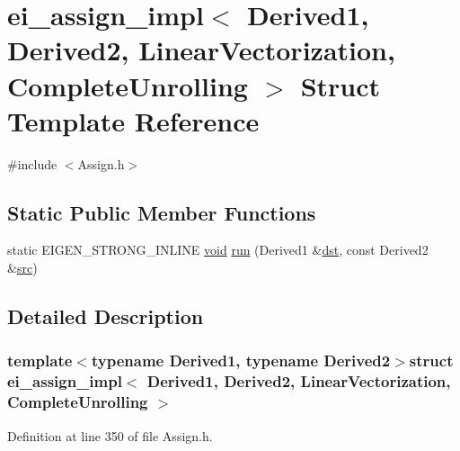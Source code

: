 \hypertarget{structei__assign__impl_3_01_derived1_00_01_derived2_00_01_linear_vectorization_00_01_complete_unrolling_01_4}{\section{ei\-\_\-assign\-\_\-impl$<$ Derived1, Derived2, Linear\-Vectorization, Complete\-Unrolling $>$ Struct Template Reference}
\label{structei__assign__impl_3_01_derived1_00_01_derived2_00_01_linear_vectorization_00_01_complete_unrolling_01_4}
}


{\ttfamily \#include $<$Assign.\-h$>$}

\subsection*{Static Public Member Functions}
\begin{DoxyCompactItemize}
\item 
static E\-I\-G\-E\-N\-\_\-\-S\-T\-R\-O\-N\-G\-\_\-\-I\-N\-L\-I\-N\-E \hyperlink{group___u_a_v_objects_plugin_ga444cf2ff3f0ecbe028adce838d373f5c}{void} \hyperlink{structei__assign__impl_3_01_derived1_00_01_derived2_00_01_linear_vectorization_00_01_complete_unrolling_01_4_ad40d6b80bc1464ceb2436bd9dfbfa150}{run} (Derived1 \&\hyperlink{glext_8h_a92034251bfd455d524a9b5610cddba00}{dst}, const Derived2 \&\hyperlink{glext_8h_a72e0fdf0f845ded60b1fada9e9195cd7}{src})
\end{DoxyCompactItemize}


\subsection{Detailed Description}
\subsubsection*{template$<$typename Derived1, typename Derived2$>$struct ei\-\_\-assign\-\_\-impl$<$ Derived1, Derived2, Linear\-Vectorization, Complete\-Unrolling $>$}



Definition at line 350 of file Assign.\-h.




